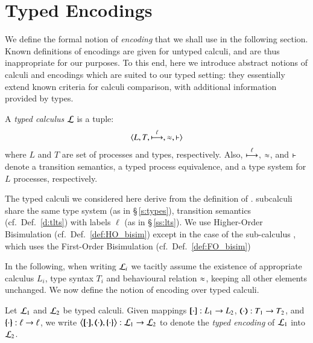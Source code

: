 
\section{Typed Encodings}\label{s:expr}

We define the formal notion of \emph{encoding} that we
shall use in the following section.
Known definitions of encodings are given for untyped calculi,
and are thus inappropriate for our purposes.
To this end, 
here we introduce abstract notions of calculi and encodings which are suited to our typed setting: they
essentially extend known criteria for calculi comparison, with 
additional information provided by types.



\begin{definition}\label{d:tcalculus}\rm
	A \emph{typed calculus} $\mathcal{L}$ is a tuple:
%
	\[
		\langle L, T, \stackrel{\ell}{\longmapsto}, \approx, \vdash \rangle
	\]
%
	where $L$ and $T$ are set of processes and types, respectively.
	Also, $\stackrel{\ell}{\longmapsto}$, $\approx$, and $\vdash$ 
	denote a transition semantics, a typed process equivalence, 
	and a type system for $L$ processes, respectively. 
\end{definition}

The typed calculi we considered here
derive from the definition of \HOp.
\HOp subcalculi share the same
type system (as in \S\,\ref{s:types}),
transition semantics (cf.~Def.~\ref{d:tlts}) 
with labels $\ell$ (as in  \S\,\ref{ss:lts}).
We use Higher-Order Bisimulation
(cf.~Def.~\ref{def:HO_bisim}) except in the case
of the sub-calculus  \sessp, which uses the
First-Order Bisimulation (cf.~Def.~\ref{def:FO_bisim})

In the following, when writing $\mathcal{L}_i$ we tacitly
assume the existence of appropriate 
calculus $L_i$, type syntax $T_i$ and behavioural relation $\approx$,
keeping all other elements unchanged.
We now define the notion of encoding over typed calculi.

\begin{definition}\rm
	Let  $\mathcal{L}_1$ and $\mathcal{L}_2$ 
	be typed calculi.
	Given mappings $[\!\![\cdot]\!\!]: L_1 \to L_2$, 
	$(\!\!\langle\cdot\rangle\!\!): T_1 \to T_2$, and 
	$\{\!\!\{\cdot\}\!\!\}: \ell \to \ell$, 
	we write 
	$\enco{\map{\cdot}, \mapt{\cdot}, \mapa{\cdot}} : \tyl{L}_1 \to \tyl{L}_2$
	to denote the \emph{typed encoding} of $\mathcal{L}_1$ into $\mathcal{L}_2$.
\end{definition}

